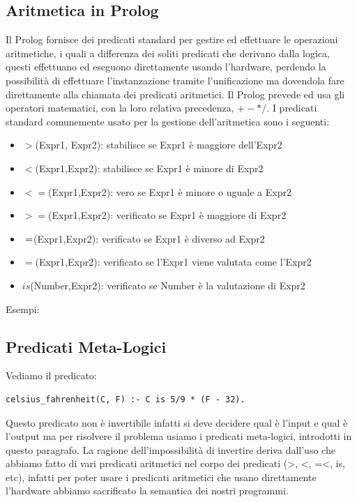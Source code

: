 \subsection{Aritmetica in Prolog}
Il Prolog fornisce dei predicati standard per gestire ed effettuare le operazioni aritmetiche, i quali a differenza dei soliti predicati
che derivano dalla logica, questi effettuano ed eseguono  direttamente usando l’hardware, perdendo la possibilità di effettuare
l’instanzazione tramite l’unificazione ma dovendola fare direttamente alla chiamata dei predicati aritmetici.\newline
Il Prolog prevede ed usa gli operatori matematici, con la loro relativa precedenza, $+ - * /$.\newline
I predicati standard comunemente usato per la gestione dell’aritmetica sono i seguenti:
\begin{itemize}
    \item $>$(Expr1, Expr2): stabilisce se Expr1 è maggiore dell’Expr2
    \item $<$(Expr1,Expr2): stabilisce se Expr1 è minore di Expr2
    \item $<=$(Expr1,Expr2): vero se Expr1 è minore o uguale a Expr2
    \item $>=$(Expr1,Expr2): verificato se Expr1 è maggiore di Expr2
    \item $\\=$(Expr1,Expr2): verificato se Expr1 è diverso ad Expr2
    \item $=$(Expr1,Expr2): verificato se l’Expr1 viene valutata come l’Expr2
    \item $is$(Number,Expr2): verificato se Number è la valutazione di Expr2
\end{itemize}
Esempi:

\subsection{Predicati Meta-Logici}
Vediamo il predicato:
\begin{verbatim}
celsius_fahrenheit(C, F) :- C is 5/9 * (F - 32).
\end{verbatim}
Questo predicato non è invertibile infatti si deve decidere qual è l'input e qual è l'output ma per risolvere il problema usiamo
i predicati meta-logici, introdotti in questo paragrafo.\newline
La ragione dell'impossibilità di invertire deriva dall'uso che abbiamo fatto di vari predicati aritmetici nel corpo dei predicati
(>, <, =<, is, etc), infatti per poter usare i predicati aritmetici che usano direttamente l'hardware
abbiamo sacrificato la semantica dei nostri programmi.

